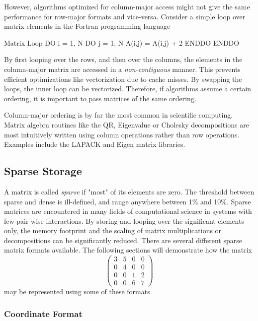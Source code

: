 However, algorithms optimized for column-major access might not give the same performance for row-major formats and vice-versa. Consider a simple loop over matrix elements in the Fortran programming language
\begin{fortran}{Matrix Loop \label{FORTRAN1}}
DO i = 1, N
 DO j = 1, N
  A(i,j) = A(i,j) + 2
 ENDDO
ENDDO
\end{fortran}
\noindent By first looping over the rows, and then over the columns, the elements in the column-major matrix are accessed in a \emph{non-contiguous} manner. This prevents efficient optimizations like vectorization due to cache misses. By swapping the loops, the inner loop can be vectorized. Therefore, if algorithms assume a certain ordering, it is important to pass matrices of the same ordering.

Column-major ordering is by far the most common in scientific computing. Matrix algebra routines like the QR, Eigenvalue or Cholesky decompositions are most intuitively written using column operations rather than row operations. Examples include the LAPACK and Eigen matrix libraries. 

\subsection{Sparse Storage}

A matrix is called \emph{sparse} if "most" of its elements are zero. The threshold between sparse and dense is ill-defined, and range anywhere between 1\% and 10\%. Sparse matrices are encountered in many fields of computational science in systems with few pair-wise interactions. By storing and looping over the significant elements only, the memory footprint and the scaling of matrix multiplications or decompositions can be significantly reduced. There are several different sparse matrix formats available. The following sections will demonstrate how the matrix
\begin{equation*}
\begin{pmatrix}
3 & 5 & 0 & 0 \\
0 & 4 & 0 & 0 \\
0 & 0 & 1 & 2 \\
0 & 0 & 6 & 7 
\end{pmatrix}
\end{equation*}
\noindent may be represented using some of these formats.

\subsubsection{Coordinate Format}

